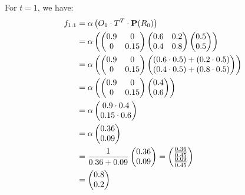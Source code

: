For $t=1$, we have:
\begin{align*}
f_{1:1} &= \alpha \left( O_1 \cdot T^T \cdot \textbf{P}(R_0) \right) \\
&= \alpha \left( 
\begin{pmatrix}
0.9 & 0 \\
0 & 0.15
\end{pmatrix}
\begin{pmatrix}
0.6 & 0.2 \\
0.4 & 0.8
\end{pmatrix}
\begin{pmatrix}
0.5 \\
0.5
\end{pmatrix}
\right) \\
&= \alpha \left( 
\begin{pmatrix}
0.9 & 0 \\
0 & 0.15
\end{pmatrix}
\begin{pmatrix}
(0.6 \cdot 0.5) + (0.2 \cdot 0.5) \\
(0.4 \cdot 0.5) + (0.8 \cdot 0.5)
\end{pmatrix}
\right) \\
&= \alpha \left( 
\begin{pmatrix}
0.9 & 0 \\
0 & 0.15
\end{pmatrix}
\begin{pmatrix}
0.4 \\
0.6
\end{pmatrix}
\right) \\
&= \alpha 
\begin{pmatrix}
0.9 \cdot 0.4 \\
0.15 \cdot 0.6
\end{pmatrix} \\
&= \alpha 
\begin{pmatrix}
0.36 \\
0.09
\end{pmatrix} \\
&= \frac{1}{0.36 + 0.09} \begin{pmatrix} 0.36 \\ 0.09 \end{pmatrix} = \begin{pmatrix} \frac{0.36}{0.45} \\ \frac{0.09}{0.45} \end{pmatrix} \\
&= \begin{pmatrix} 0.8 \\ 0.2 \end{pmatrix}
\end{align*}


